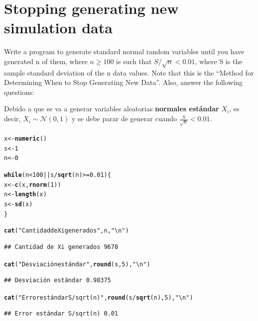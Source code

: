 \documentclass[12pt]{article}\usepackage[]{graphicx}\usepackage[]{xcolor}
\makeatletter
\newcommand{\hlnum}[1]{\textcolor[rgb]{0.686,0.059,0.569}{#1}}%
\newcommand{\hlsng}[1]{\textcolor[rgb]{0.192,0.494,0.8}{#1}}%
\newcommand{\hlopt}[1]{\textcolor[rgb]{0,0,0}{#1}}%
\newcommand{\hldef}[1]{\textcolor[rgb]{0.345,0.345,0.345}{#1}}%
\newcommand{\hlkwa}[1]{\textcolor[rgb]{0.161,0.373,0.58}{\textbf{#1}}}%
\newcommand{\hlkwb}[1]{\textcolor[rgb]{0.69,0.353,0.396}{#1}}%
\newcommand{\hlkwd}[1]{\textcolor[rgb]{0.737,0.353,0.396}{\textbf{#1}}}%
\newenvironment{kframe}{%
 \def\at@end@of@kframe{}%
 \ifinner\ifhmode%
  \def\at@end@of@kframe{\end{minipage}}%
  \begin{minipage}{\columnwidth}%
 \fi\fi%
 \def\FrameCommand##1{\hskip\@totalleftmargin \hskip-\fboxsep
 \colorbox{shadecolor}{##1}\hskip-\fboxsep
     \hskip-\linewidth \hskip-\@totalleftmargin \hskip\columnwidth}%
 \MakeFramed {\advance\hsize-\width
   \@totalleftmargin\z@ \linewidth\hsize
   \@setminipage}}%
 {\par\unskip\endMakeFramed%
 \at@end@of@kframe}
\newenvironment{knitrout}{}{} %
\makeatother
\begin{document}
\section{Stopping generating new simulation data}

Write a program to generate standard normal random variables until you have generated n of them, where $n \geq 100$ is such that $S/\sqrt{n} < 0.01$, where S is the sample standard deviation of the n data values. Note that this is the ``Method for Determining When to Stop Generating New Data''. Also, answer the following questions:



Debido a que se va a generar variables aleatorias \textbf{normales estándar} $X_{i}$, es decir, $X_{i} \sim \mathcal{N}(0, 1)$ y se debe parar de generar cuando $\frac{S}{\sqrt{n}} < 0.01$.

\begin{knitrout}
\color{fgcolor}\begin{kframe}
\begin{alltt}
\hldef{x} \hlkwb{<-} \hlkwd{numeric}\hldef{()}
\hldef{s} \hlkwb{<-} \hlnum{1}
\hldef{n} \hlkwb{<-} \hlnum{0}

\hlkwa{while}\hldef{(n} \hlopt{<} \hlnum{100} \hlopt{||} \hldef{s} \hlopt{/} \hlkwd{sqrt}\hldef{(n)} \hlopt{>=} \hlnum{0.01}\hldef{) \{}
  \hldef{x} \hlkwb{<-} \hlkwd{c}\hldef{(x,} \hlkwd{rnorm}\hldef{(}\hlnum{1}\hldef{))}
  \hldef{n} \hlkwb{<-} \hlkwd{length}\hldef{(x)}
  \hldef{s} \hlkwb{<-} \hlkwd{sd}\hldef{(x)}
\hldef{\}}

\hlkwd{cat}\hldef{(}\hlsng{"Cantidad de Xi generados"}\hldef{, n,} \hlsng{"\textbackslash{}n"}\hldef{)}
\end{alltt}
\begin{verbatim}
## Cantidad de Xi generados 9678
\end{verbatim}
\begin{alltt}
\hlkwd{cat}\hldef{(}\hlsng{"Desviación estándar"}\hldef{,} \hlkwd{round}\hldef{(s,} \hlnum{5}\hldef{),} \hlsng{"\textbackslash{}n"}\hldef{)}
\end{alltt}
\begin{verbatim}
## Desviación estándar 0.98375
\end{verbatim}
\begin{alltt}
\hlkwd{cat}\hldef{(}\hlsng{"Error estándar S/sqrt(n)"}\hldef{,} \hlkwd{round}\hldef{(s}\hlopt{/}\hlkwd{sqrt}\hldef{(n),} \hlnum{5}\hldef{),} \hlsng{"\textbackslash{}n"}\hldef{)}
\end{alltt}
\begin{verbatim}
## Error estándar S/sqrt(n) 0.01
\end{verbatim}
\end{kframe}
\end{knitrout}
\end{document}
